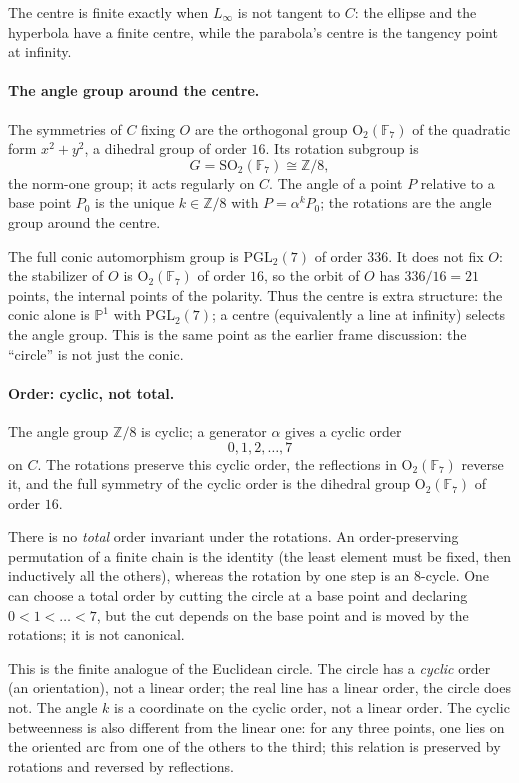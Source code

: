 \documentclass[11pt]{article}
\theoremstyle{definition}
\theoremstyle{remark}
\newcommand{\F}{\mathbb{F}}
\newcommand{\Z}{\mathbb{Z}}
\begin{document}
The centre is finite exactly when $L_\infty$ is not tangent to $C$: the ellipse
and the hyperbola have a finite centre, while the parabola's centre is the
tangency point at infinity.

\paragraph{The angle group around the centre.}
The symmetries of $C$ fixing $O$ are the orthogonal group
$\mathrm{O}_2(\F_7)$ of the quadratic form $x^2+y^2$, a dihedral group of
order $16$.  Its rotation subgroup is
\[
  G=\mathrm{SO}_2(\F_7)\cong\Z/8,
\]
the norm-one group; it acts regularly on $C$.  The angle of a point $P$ relative
to a base point $P_0$ is the unique $k\in\Z/8$ with $P=\alpha^k P_0$; the
rotations are the angle group around the centre.

The full conic automorphism group is $\mathrm{PGL}_2(7)$ of order $336$.  It
does not fix $O$: the stabilizer of $O$ is $\mathrm{O}_2(\F_7)$ of order $16$,
so the orbit of $O$ has $336/16=21$ points, the internal points of the
polarity.  Thus the centre is extra structure: the conic alone is
$\mathbb P^1$ with $\mathrm{PGL}_2(7)$; a centre (equivalently a line at
infinity) selects the angle group.  This is the same point as the earlier
frame discussion: the ``circle'' is not just the conic.

\paragraph{Order: cyclic, not total.}
The angle group $\Z/8$ is cyclic; a generator $\alpha$ gives a cyclic order
\[
  0,1,2,\dots,7
\]
on $C$.  The rotations preserve this cyclic order, the reflections in
$\mathrm{O}_2(\F_7)$ reverse it, and the full symmetry of the cyclic order is
the dihedral group $\mathrm{O}_2(\F_7)$ of order $16$.

There is no \emph{total} order invariant under the rotations.  An
order-preserving permutation of a finite chain is the identity (the least
element must be fixed, then inductively all the others), whereas the rotation
by one step is an $8$-cycle.  One can choose a total order by cutting the circle
at a base point and declaring $0<1<\dots<7$, but the cut depends on the base
point and is moved by the rotations; it is not canonical.

This is the finite analogue of the Euclidean circle.  The circle has a
\emph{cyclic} order (an orientation), not a linear order; the real line has a
linear order, the circle does not.  The angle $k$ is a coordinate on the cyclic
order, not a linear order.  The cyclic betweenness is also different from the
linear one: for any three points, one lies on the oriented arc from one of the
others to the third; this relation is preserved by rotations and reversed by
reflections.
\end{document}
